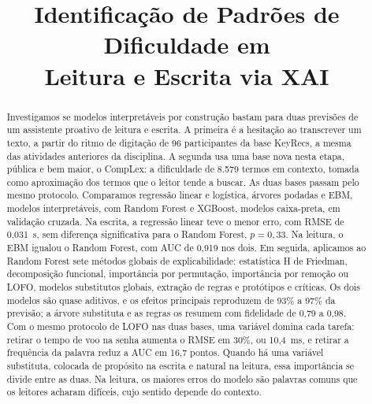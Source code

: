 \documentclass[conference]{IEEEtran}
\begin{document}

\title{Identificação de Padrões de Dificuldade em\\ Leitura e Escrita via XAI}

\author{%
}

\maketitle

\begin{abstract}
Investigamos se modelos interpretáveis por construção bastam para duas
previsões de um assistente proativo de leitura e escrita. A primeira é a
hesitação ao transcrever um texto, a partir do ritmo de digitação de 96
participantes da base KeyRecs, a mesma das atividades anteriores da disciplina.
A segunda usa uma base nova nesta etapa, pública e bem maior, o CompLex: a
dificuldade de 8.579 termos em contexto, tomada como aproximação dos termos que
o leitor tende a buscar. As duas bases passam pelo mesmo protocolo.
Comparamos regressão linear e logística, árvores podadas e EBM, modelos
interpretáveis, com Random Forest e XGBoost, modelos caixa-preta, em validação
cruzada. Na escrita, a regressão linear teve o menor erro, com RMSE de
0,031~s, sem diferença significativa para o Random Forest, $p = 0,33$. Na
leitura, o EBM igualou o Random Forest, com AUC de 0,919 nos dois. Em seguida,
aplicamos ao Random Forest sete métodos globais de explicabilidade: estatística
H de Friedman, decomposição funcional, importância por permutação, importância
por remoção ou LOFO, modelos substitutos globais, extração de regras e
protótipos e críticas. Os dois modelos são quase aditivos, e os efeitos
principais reproduzem de 93\% a 97\% da previsão; a árvore substituta e as
regras os resumem com fidelidade de 0,79 a 0,98. Com o mesmo protocolo de LOFO
nas duas bases, uma variável domina cada tarefa: retirar o tempo de voo na
senha aumenta o RMSE em 30\%, ou 10,4~ms, e retirar a frequência da palavra
reduz a AUC em 16,7 pontos. Quando há uma variável substituta, colocada de
propósito na escrita e natural na leitura, essa importância se divide entre as
duas. Na leitura, os maiores erros do modelo são palavras comuns que os leitores
acharam difíceis, cujo sentido depende do contexto.
\end{abstract}
\end{document}
